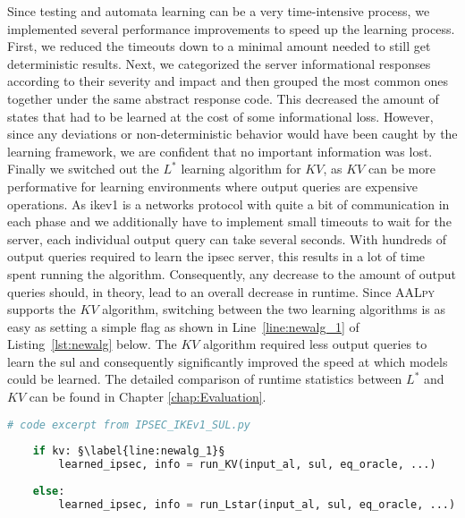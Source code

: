 Since testing and automata learning can be a very time-intensive process, we implemented several performance improvements to speed up the learning process. First, we reduced the timeouts down to a minimal amount needed to still get deterministic results. Next, we categorized the server informational responses according to their severity and impact and then grouped the most common ones together under the same abstract response code. This decreased the amount of states that had to be learned at the cost of some informational loss. However, since any deviations or non-deterministic behavior would have been caught by the learning framework, we are confident that no important information was lost. Finally we switched out the $L^*$ learning algorithm for $KV$, as $KV$ can be more performative for learning environments where output queries are expensive operations. As \ac{ike}v1 is a networks protocol with quite a bit of communication in each phase and we additionally have to implement small timeouts to wait for the server, each individual output query can take several seconds. With hundreds of output queries required to learn the \ac{ipsec} server, this results in a lot of time spent running the algorithm. Consequently, any decrease to the amount of output queries should, in theory, lead to an overall decrease in runtime. Since \textsc{AALpy} supports the $KV$ algorithm, switching between the two learning algorithms is as easy as setting a simple flag as shown in Line~\ref{line:newalg_1} of Listing~\ref{lst:newalg} below. The $KV$ algorithm required less output queries to learn the \ac{sul} and consequently significantly improved the speed at which models could be learned. The detailed comparison of runtime statistics between $L^*$ and $KV$ can be found in Chapter \ref{chap:Evaluation}. \\

\begin{lstlisting}[float=ht, caption=Switching learning algorithms in code., label=lst:newalg, language=python, escapechar=§]
	# code excerpt from IPSEC_IKEv1_SUL.py
	
	if kv: §\label{line:newalg_1}§
		learned_ipsec, info = run_KV(input_al, sul, eq_oracle, ...)
	
	else:
		learned_ipsec, info = run_Lstar(input_al, sul, eq_oracle, ...)
\end{lstlisting}



